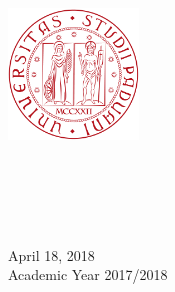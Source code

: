 
\begin{titlepage}

\begin{center}
\large

\hfill


\includegraphics[height=3.5cm]{gfx/logos/unipd}%

\vspace*{1cm}
\begingroup
	\large
	\spacedallcaps{\myUni}\\\medskip    
    \normalsize
    \color{black}\spacedallcaps{\myDepartment} \\
    \color{black}{\mySubtitle}
\endgroup

\vfill

\begingroup
\large \color{Maroon}\spacedallcaps{\myTitle} \\ \bigskip %
\endgroup
\vfill






\centering

\vfill



{
	\normalsize
    April 18, 2018\\
	Academic Year 2017/2018 %
}



\end{center}

\end{titlepage}
